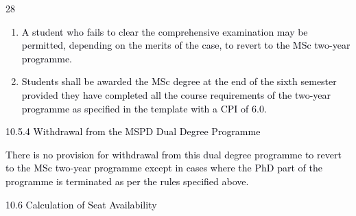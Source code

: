 \documentclass[12pt]{article}
\begin{document}
\vspace{\baselineskip}
\begin{Center}
\textcolor[HTML]{00000A}{28}
\end{Center}\par


\vspace{\baselineskip}
\begin{enumerate}
	\item {\fontsize{10pt}{12.0pt}\selectfont \textcolor[HTML]{00000A}{A student who fails to clear the comprehensive examination may be permitted, depending on the merits of the case, to revert to the MSc two-year programme.}\par}\par


\vspace{\baselineskip}
	\item {\fontsize{10pt}{12.0pt}\selectfont \textcolor[HTML]{00000A}{Students shall be awarded the MSc degree at the end of the sixth semester provided they have completed all the course requirements of the two-year programme as specified in the template with a CPI of 6.0.}\par}
\end{enumerate}\par


\vspace{\baselineskip}
{\fontsize{10pt}{12.0pt}\selectfont \textcolor[HTML]{00000A}{10.5.4 Withdrawal from the MSPD Dual Degree Programme}\par}\par


\vspace{\baselineskip}
\begin{adjustwidth}{0.0in}{0.72in}
{\fontsize{9pt}{10.8pt}\selectfont \textcolor[HTML]{00000A}{There is no provision for withdrawal from this dual degree programme to revert to the MSc two-year programme except in cases where the PhD part of the programme is terminated as per the rules specified above.}\par}\par

\end{adjustwidth}


\vspace{\baselineskip}

\vspace{\baselineskip}
\textcolor[HTML]{00000A}{10.6 Calculation of Seat Availability}\par
\end{document}
